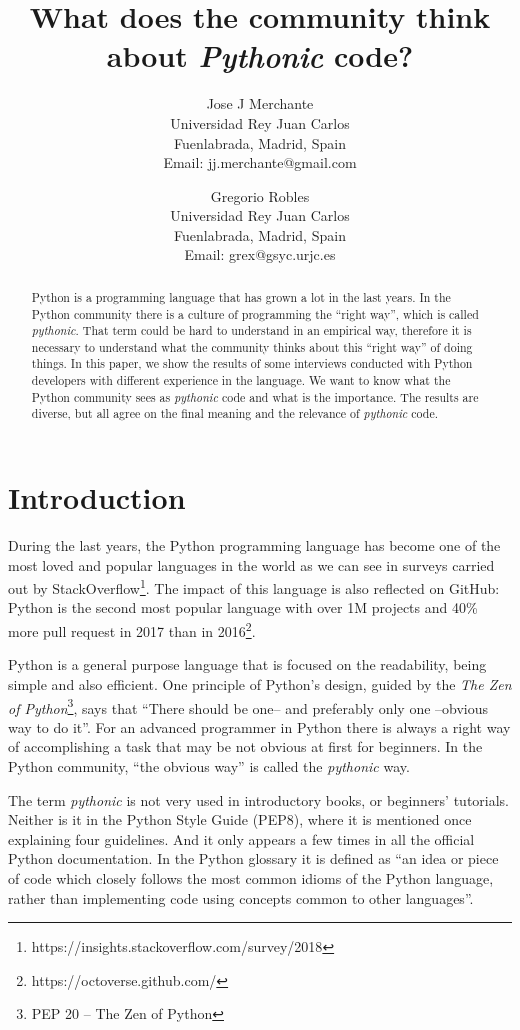 \documentclass[a4paper]{article}
\title{What does the community think about \textit{Pythonic} code?}
\author{
Jose J Merchante \\ 
Universidad Rey Juan Carlos\\
Fuenlabrada, Madrid, Spain\\
Email: jj.merchante@gmail.com
\and
Gregorio Robles \\
Universidad Rey Juan Carlos\\
Fuenlabrada, Madrid, Spain\\
Email: grex@gsyc.urjc.es
}
\begin{document}
\maketitle

\begin{abstract}
Python is a programming language that has grown a lot in the last years. In the Python community there is a culture of programming the ``right way'', which is called \textit{pythonic}. That term could be hard to understand in an empirical way, therefore it is necessary to understand what the community thinks about this ``right way'' of doing things. In this paper, we show the results of some interviews conducted with Python developers with different experience in the language. We want to know what the Python community sees as \textit{pythonic} code and what is the importance. The results are diverse, but all agree on the final meaning and the relevance of \textit{pythonic} code.

\end{abstract}


\section{Introduction}

During the last years, the Python programming language has become one of the most loved and popular languages in the world as we can see in surveys carried out by StackOverflow\footnote{https://insights.stackoverflow.com/survey/2018}. The impact of this language is also reflected on GitHub: Python is the second most popular language with over 1M projects and 40\% more pull request in 2017 than in 2016\footnote{https://octoverse.github.com/}. 

Python is a general purpose language that is focused on the readability, being simple and also efficient. One principle of Python's design, guided by the \textit{The Zen of Python}\footnote{PEP 20 -- The Zen of Python}, says that ``There should be one-- and preferably only one --obvious way to do it''. For an advanced programmer in Python there is always a right way of accomplishing a task that may be not obvious at first for beginners. In the Python community, ``the obvious way'' is called the \emph{pythonic} way.

The term \textit{pythonic} is not very used in introductory books, or beginners' tutorials. Neither is it in the Python Style Guide (PEP8), where it is mentioned once explaining four guidelines.  And it only appears a few times in all the official Python documentation. In the Python glossary it is defined as ``an idea or piece of code which closely follows the most common idioms of the Python language, rather than implementing code using concepts common to other languages''.
\end{document}
